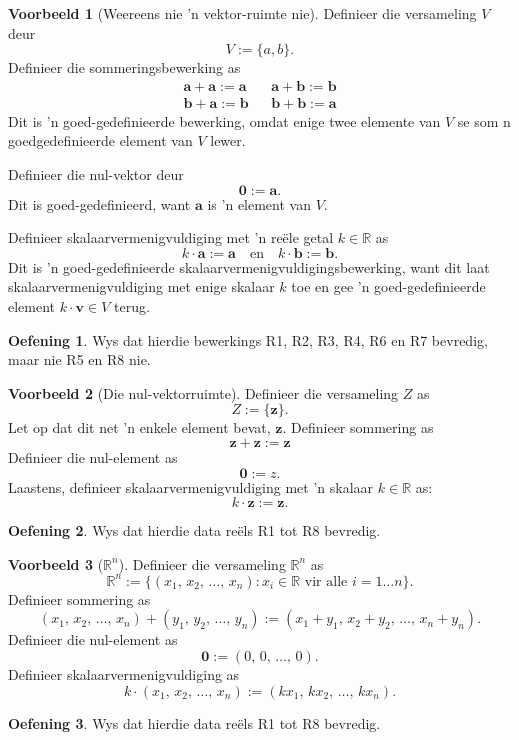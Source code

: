 \documentclass[a4paper,11pt]{book}
\theoremstyle{definition}
\newtheorem{exercise}{Oefening}
\newtheorem{example_environment}{Voorbeeld}[chapter]
\newcommand{\be}{\begin{equation}}
\newcommand{\ee}{\end{equation}}
\newcommand{\ve}[1]{\mathbf{#1}}
\newenvironment{example}
	{
		\begin{oframed}
		\begin{example_environment}
	}
	{
		\end{example_environment}
		\end{oframed}
	}
\begin{document}
\begin{example}[Weereens nie 'n vektor-ruimte nie] Definieer die
	versameling $V$ deur
	\be
	V := \{ a, b \} .
	\ee
	Definieer die sommeringsbewerking as
	\begin{align}
		\ve{a} + \ve{a} := \ve{a} && \ve{a} + \ve{b} := \ve{b}
		\label{ne_11} \\
		\ve{b} + \ve{a} := \ve{b} && \ve{b} + \ve{b} := \ve{a}
		\label{ne_12}
	\end{align}
	Dit is 'n goed-gedefinieerde bewerking, omdat enige twee elemente van
	$V$ se som n goedgedefinieerde element van $V$ lewer.

	Definieer die nul-vektor deur
	\be
	\ve{0} := \ve{a}. \label{ne_13}
	\ee
	Dit is goed-gedefinieerd, want $\ve{a}$ is 'n element van $V$.

	Definieer skalaarvermenigvuldiging met 'n re{\"e}le getal $k \in
	\mathbb{R}$ as
	\be
	k \cdot \ve{a} := \ve{a} \quad \mbox{en} \quad k \cdot \ve{b} :=
	\ve{b}. \label{ne_14}
	\ee
	Dit is 'n goed-gedefinieerde skalaarvermenigvuldigingsbewerking, want
	dit laat skalaarvermenigvuldiging met enige skalaar $k$ toe en gee 'n
	goed-gedefinieerde element $k \cdot \ve{v} \in V$ terug.
	\begin{exercise}
		Wys dat hierdie bewerkings R1, R2, R3, R4, R6 en R7 bevredig, maar
		nie R5 en R8 nie.
	\end{exercise}
\end{example}


\begin{example}[Die nul-vektorruimte] Definieer die versameling $Z$ as
	\be
	Z := \{ \ve{z} \}.
	\ee
	Let op dat dit net 'n enkele element bevat, $\ve{z}$. Definieer
	sommering as
	\be
	\ve{z} + \ve{z} := \ve{z}
	\ee
	Definieer die nul-element as
	\be
	\ve{0} := z.
	\ee
	Laastens, definieer skalaarvermenigvuldiging met 'n skalaar $k \in
	\mathbb{R}$ as:
	\be
	k \cdot \ve{z} := \ve{z}.
	\ee
	\begin{exercise} Wys dat hierdie data re{\"e}ls R1 tot R8 bevredig.
	\end{exercise}

\end{example}

\begin{example}[$\mathbb{R}^n$] Definieer die versameling $\mathbb{R}^n$ as
	\be
	\mathbb{R}^n := \{ (x_1, \, x_2, \, \ldots, \, x_n) : x_i \in
	\mathbb{R} \mbox{ vir alle } i = 1 \ldots n\}.
	\ee
	Definieer sommering as
	\be
	(x_1, \, x_2, \, \ldots, \, x_n) + (y_1, \, y_2, \, \ldots, \, y_n) :=
	(x_1 + y_1, \, x_2 + y_2, \, \ldots, \, x_n + y_n).
	\ee
	Definieer die nul-element as
	\be
	\ve{0} := (0, \, 0, \, \ldots, \, 0).
	\ee
	Definieer skalaarvermenigvuldiging as
	\be
	k \cdot (x_1, \, x_2, \, \ldots, \, x_n) := (k x_1, \, k x_2, \,
	\ldots, \, k x_n).
	\ee
	\begin{exercise} Wys dat hierdie data re{\"e}ls R1 tot R8 bevredig.
	\end{exercise}
\end{example}
\end{document}
